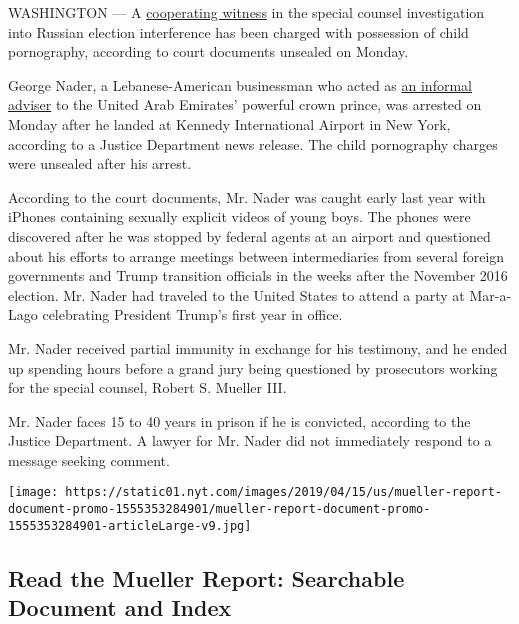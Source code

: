 WASHINGTON --- A
\href{https://www.nytimes.com/2018/03/06/us/politics/george-nader-special-counsel-mueller-cooperating-seychelles.html}{cooperating
witness} in the special counsel investigation into Russian election
interference has been charged with possession of child pornography,
according to court documents unsealed on Monday.

George Nader, a Lebanese-American businessman who acted as
\href{https://www.nytimes.com/2018/03/03/us/politics/george-nader-mueller-investigation-united-arab-emirates.html}{an
informal adviser} to the United Arab Emirates' powerful crown prince,
was arrested on Monday after he landed at Kennedy International Airport
in New York, according to a Justice Department news release. The child
pornography charges were unsealed after his arrest.

According to the court documents, Mr. Nader was caught early last year
with iPhones containing sexually explicit videos of young boys. The
phones were discovered after he was stopped by federal agents at an
airport and questioned about his efforts to arrange meetings between
intermediaries from several foreign governments and Trump transition
officials in the weeks after the November 2016 election. Mr. Nader had
traveled to the United States to attend a party at Mar-a-Lago
celebrating President Trump's first year in office.

Mr. Nader received partial immunity in exchange for his testimony, and
he ended up spending hours before a grand jury being questioned by
prosecutors working for the special counsel, Robert S. Mueller III.

Mr. Nader faces 15 to 40 years in prison if he is convicted, according
to the Justice Department. A lawyer for Mr. Nader did not immediately
respond to a message seeking comment.

\href{https://www.nytimes.com/interactive/2019/04/18/us/politics/mueller-report-document.html}{}

\texttt{[image: https://static01.nyt.com/images/2019/04/15/us/mueller-report-document-promo-1555353284901/mueller-report-document-promo-1555353284901-articleLarge-v9.jpg]}

\hypertarget{read-the-mueller-report-searchable-document-and-index}{%
\subsection{Read the Mueller Report: Searchable Document and
Index}\label{read-the-mueller-report-searchable-document-and-index}}

